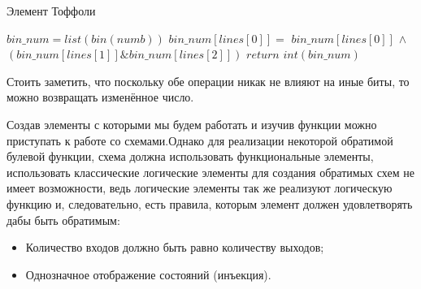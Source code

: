 \documentclass[14pt]{extarticle} %
\begin{document}
  \begin{algorithm}
	\caption{Элемент Тоффоли}\label{alg:tof}
	\begin{algorithmic}[1]
		
		\State $bin\_num=list(bin(numb))$
		\State $bin\_num[lines[0]] =$ $bin\_num[lines[0]]$  $\wedge$\State $(bin\_num[lines[1]]\& bin\_num[lines[2]])$
		\State $return$ $int(bin\_num)$
		\EndProcedure
		
		
	\end{algorithmic}
\end{algorithm}


Стоить заметить, что поскольку обе операции никак не влияют на иные биты, то можно возвращать изменённое число.








Создав элементы с которыми мы будем работать и изучив функции можно приступать к работе со схемами.Однако для реализации некоторой обратимой булевой функции, схема должна использовать функциональные элементы, использовать классические логические элементы для создания обратимых схем не имеет возможности, ведь логические элементы так же реализуют логическую функцию и, следовательно, есть правила, которым элемент должен удовлетворять дабы быть обратимым:
\begin{itemize}
	\item Количество входов должно быть равно количеству выходов;
	\item Однозначное отображение состояний (инъекция).
\end{itemize}  
\end{document}
